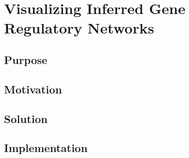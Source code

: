 \chapter{Visualizing Inferred Gene Regulatory Networks}

\section{Purpose}

\section{Motivation}

\section{Solution}

\section{Implementation}